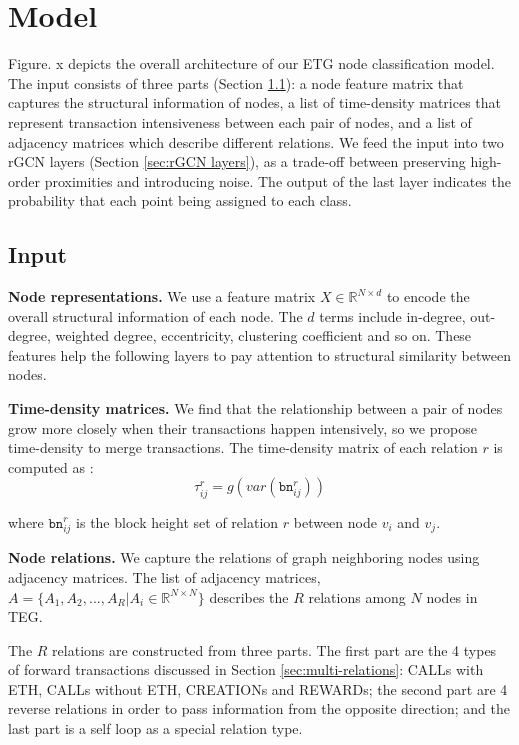 
\section{Model}
Figure. x depicts the overall architecture of our ETG node classification model. The input consists of three parts (Section \ref{sec:input}): a node feature matrix that captures the structural information of nodes, a list of time-density matrices that represent transaction intensiveness between each pair of nodes, and a list of adjacency matrices which describe different relations. We feed the input into two rGCN layers (Section \ref{sec:rGCN layers}), as a trade-off between preserving high-order proximities and introducing noise. The output of the last layer indicates the probability that each point being assigned to each class.

\subsection{Input}
\label{sec:input}
\textbf{Node representations.} We use a feature matrix $X \in \mathbb{R}^{N \times d}$ to encode the overall structural information of each node. The $d$ terms include in-degree, out-degree, weighted degree, eccentricity, clustering coefficient and so on. These features help the following layers to pay attention to structural similarity between nodes.

\textbf{Time-density matrices.} We find that the relationship between a pair of nodes grow more closely when their transactions happen intensively, so we propose time-density to merge transactions. The time-density matrix of each relation $r$ is computed as :%
\begin{equation}
\tau_{ij}^r=g(var(\texttt{bn}_{ij}^r))
\label{eq:time}
\end{equation}

where $\texttt{bn}_{ij}^{r}$ is the block height set of relation $r$ between node $v_i$ and $v_j$. 

\textbf{Node relations.} We capture the relations of graph neighboring nodes using adjacency matrices. The list of adjacency matrices, $A=\{A_1,A_2,...,A_R|A_i\in \mathbb{R}^{N \times N}\}$ describes the $R$ relations among $N$ nodes in TEG.

The $R$ relations are constructed from three parts. The first part are the 4 types of forward transactions discussed in Section \ref{sec:multi-relations}: CALLs with ETH, CALLs without ETH, CREATIONs and REWARDs; the second part are 4 reverse relations in order to pass information from the opposite direction; and the last part is a self loop as a special relation type.

